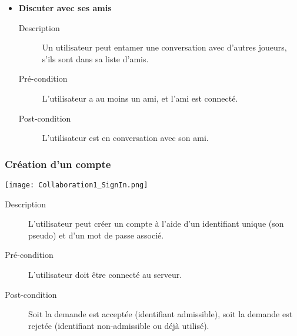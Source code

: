 \documentclass[12pt]{article}
\begin{document}
\begin{itemize}
				\item \textbf{Discuter avec ses amis}
				\begin{description}
					\item[Description] Un utilisateur peut entamer une conversation avec d'autres joueurs, s'ils sont dans sa liste d'amis.
					\item[Pré-condition] L'utilisateur a au moins un ami, et l'ami est connecté.
					\item[Post-condition] L'utilisateur est en conversation avec son ami.
				\end{description}
			\end{itemize}

		\subsubsection{Création d'un compte}
			\begin{center}\texttt{[image: Collaboration1\_SignIn.png]}\end{center}

			\begin{description}
				\item[Description] L'utilisateur peut créer un compte à l'aide d'un identifiant unique (son pseudo) et d'un mot de passe associé.
				\item[Pré-condition] L'utilisateur doit être connecté au serveur.
				\item[Post-condition] Soit la demande est acceptée (identifiant admissible), soit la demande est rejetée (identifiant non-admissible ou déjà utilisé).
			\end{description}
\end{document}
